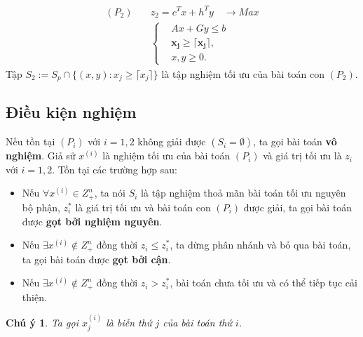 \documentclass[12pt,a4paper]{report}
\newtheorem{cy}{Chú ý}
\begin{document}
\begin{equation}
    \begin{split}
    (P_2) \quad & z_2=c^Tx+h^Ty \quad \longrightarrow Max \\
                & \left\{\begin{split}
                    &Ax+Gy \leq  b \\
                    &\mathbf{x_j \geq \lceil x_j \rceil ,} \\
                    &x,y \geq 0.
                \end{split}\right.    
    \end{split}
\end{equation}
Tập $S_2:=S_p \cap \{ (x,y): x_j \geq \lceil x_j \rceil \}$ là tập nghiệm tối ưu của bài toán con $(P_2)$.

\subsection*{Điều kiện nghiệm}
Nếu tồn tại $(P_i)$ với $i=1,2$ không giải được $(S_i = \emptyset )$, ta gọi bài toán \textbf{vô nghiệm}. Giả sử $x^{(i)}$ là nghiệm tối ưu của bài toán $(P_i)$ và giá trị tối ưu là $z_i$ với $i = 1,2$. Tồn tại các trường hợp sau:
\begin{itemize}
\item Nếu $\forall x^{(i)} \in Z^n_+$, ta nói $S_i$ là tập nghiệm thoả mãn bài toán tối ưu nguyên bộ phận, $z^*_i$ là giá trị tối ưu và bài toán con $(P_i)$ được giải, ta gọi bài toán được \textbf{gọt bởi nghiệm nguyên}.
\item Nếu $\exists x^{(i)} \notin Z^n_+$ đồng thời $z_i \leq z^*_i$, ta dừng phân nhánh và bỏ qua bài toán, ta gọi bài toán được \textbf{gọt bởi cận}.
\item Nếu $\exists x^{(i)} \notin Z^n_+$ đồng thời $z_i > z^*_i$, bài toán chưa tối ưu và có thể tiếp tục cải thiện.

\end{itemize}

\begin{cy}
Ta gọi $x_j^{(i)}$ là biến thứ $j$ của bài toán thứ $i$.
\end{cy}
\end{document}
